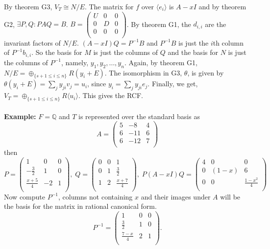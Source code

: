 By theorem G3, $V_T \cong N/E$.  The matrix for $f$ over $\langle e_i \rangle$ 
is $A-xI$ and by theorem G2, $\exists P, Q: PAQ=B$.
$B= 
\left(
\begin{array}{ccc}
U & 0 & 0\\
0 & D & 0\\
0 & 0 & 0\\
\end{array}
\right) $.  By theorem G1, the $d_{i,i}$ are the invariant factors of $N/E$.  $(A-xI)Q = P^{-1}B$ and
$P^{-1}B$ is just the $i$th column of $P^{-1} b_{i,i}$.
So the basis for $M$ is just the columns of $Q$ and the basis for $N$ is just the columns of $P^{-1}$, namely,
$y_1, y_2 , \ldots , y_n$.  Again, by theorem G1, $N/E = \oplus_{\{s+1 \leq i \leq n\}} R(y_i + E)$.
The isomorphism in G3, $\theta$, is given by $\theta(y_i + E) = \sum_j y_{ji}v_j = u_i$, since
$y_i = \sum_j y_{ji}e_j$.  Finally, we get,
$V_T= \oplus_{\{s+1 \leq i \leq n\}} R\langle u_i \rangle$.  This gives the RCF.
\\
\\
{\bf Example:} $F = \mathbb{Q}$ and $T$ is represented over the standard basis as
$$
A =
\left(
\begin{array}{ccc}
5 & -8 & 4\\
6 & -11& 6\\
6 & -12& 7\\
\end{array}
\right)
$$
then
$$
P =
\left(
\begin{array}{ccc}
1 & 0 & 0\\
-{\frac 3 2} & 1 & 0\\
{\frac {x+5} 4} & -2& 1\\
\end{array}
\right),\;
Q =
\left(
\begin{array}{ccc}
0 & 0 & 1\\
0 & 1& {\frac 3 2}\\
1 & 2& {\frac {x+7} 4}\\
\end{array}
\right),\;
P(A-xI)Q =
\left(
\begin{array}{ccc}
4 & 0 & 0\\
0 & (1-x) & 6\\
0 & 0& {\frac {1-x^2} 4} \\
\end{array}
\right)
$$
Now compute $P^{-1}$, columns not containing $x$ and their images under $A$ will be the basis for the matrix in rational canonical form.
$$
P^{-1} =
\left(
\begin{array}{ccc}
1 & 0 & 0\\
{\frac 3 2} & 1 & 0\\
{\frac {7-x} 4}  & 2& 1\\
\end{array}
\right).
$$
